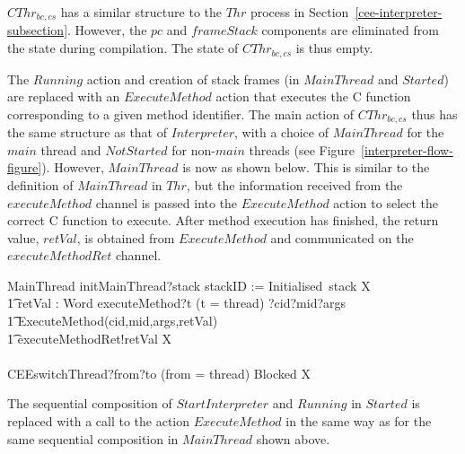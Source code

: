 $CThr_{bc,cs}$ has a similar structure to the $Thr$ process in
Section~\ref{cee-interpreter-subsection}.
However, the $pc$ and $frameStack$ components are eliminated from the
state during compilation.
The state of $CThr_{bc,cs}$ is thus empty.

The $Running$ action and creation of stack frames (in $MainThread$ and
$Started$) are replaced with an $ExecuteMethod$ action that
executes the C function corresponding to a given method identifier.
The main action of $CThr_{bc,cs}$ thus has the same structure as that
of $Interpreter$, with a choice of $MainThread$ for the $main$ thread
and $NotStarted$ for non-$main$ threads (see
Figure~\ref{interpreter-flow-figure}).
However, $MainThread$ is now as shown below.
This is similar to the definition of $MainThread$ in $Thr$, but the
information received from the $executeMethod$ channel is passed into
the $ExecuteMethod$ action to select the correct C function to
execute.
After method execution has finished, the return value, $retVal$, is
obtained from $ExecuteMethod$ and communicated on the
$executeMethodRet$ channel.
\begin{circusaction}
  MainThread \circdef initMainThread?stack \then stackID := Initialised~stack \circseq \circmu X \circspot \\
  \t1 \circblockbegin
  \circvar retVal : Word \circspot executeMethod?t \prefixcolon (t = thread) ?cid?mid?args \then {} \\
  \t1 ExecuteMethod(cid,mid,args,retVal) \circseq \\
  \t1 executeMethodRet!retVal \then X \\
  {} \extchoice {} \\
  CEEswitchThread?from?to \prefixcolon (from = thread) \then Blocked
  \circseq X \circblockend
\end{circusaction}
The sequential composition of $StartInterpreter$ and $Running$ in
$Started$ is replaced with a call to the action $ExecuteMethod$ in the
same way as for the same sequential composition in $MainThread$ shown
above.

